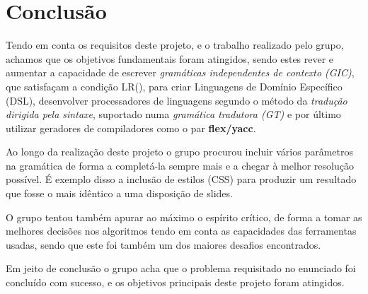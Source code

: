 \documentclass[11pt,a4paper]{report}
\begin{document}
\chapter{Conclusão}
\label{chap:concl}

Tendo em conta os requisitos deste projeto, e o trabalho realizado pelo grupo, achamos que os objetivos fundamentais foram atingidos, sendo estes rever e aumentar a capacidade de escrever \textit{gramáticas independentes de contexto (GIC)}, que satisfaçam a condição LR(), para criar Linguagens de Domínio Específico (DSL), desenvolver processadores de linguagens segundo o método da \textit{tradução dirigida pela sintaxe}, suportado numa \textit{gramática tradutora (GT)} e por último utilizar geradores de compiladores como o par \textbf{flex/yacc}.

Ao longo da realização deste projeto o grupo procurou incluir vários parâmetros na gramática de forma a completá-la sempre mais e a chegar à melhor resolução possível. É exemplo disso a inclusão de estilos (CSS) para produzir um resultado que fosse o mais idêntico a uma disposição de slides.

O grupo tentou também apurar ao máximo o espírito crítico, de forma a tomar as melhores decisões nos algoritmos tendo em conta as capacidades das ferramentas usadas, sendo que este foi também um dos maiores desafios encontrados.

Em jeito de conclusão o grupo acha que o problema requisitado no enunciado foi concluído com sucesso, e os objetivos principais deste projeto foram atingidos.
\end{document}
